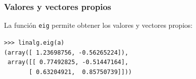 \begin{frame}[fragile]
\frametitle{Valores y vectores propios}
La función \texttt{eig} permite obtener los valores y vectores propios:
\begin{exampleblock}{}
\verb|>>> linalg.eig(a)| \\
\verb|(array([ 1.23698756, -0.56265224]),| \\
\verb| array([[ 0.77492825, -0.51447164],| \\
\verb|       [ 0.63204921,  0.85750739]]))|
\end{exampleblock}
\end{frame}

